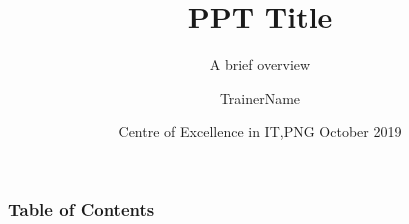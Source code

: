 \documentclass[hyperref={bookmarks=false},aspectratio=169]{beamer}
\title[PPT Title]
{\bfseries{PPT Title}}
\subtitle{A brief overview}
\author[TrainerName] %
{TrainerName\inst{1} } %
\institute[CEIT]
{
  \inst{1}
  Trainer\\
  Centre of Excellence in IT,PNG
}
\date[CEIT, 2014]
{Centre of Excellence in IT,PNG October 2019}
\begin{document}
\frame{\titlepage}  %

\begin{frame}
\frametitle{Table of Contents}
\tableofcontents
\end{frame}







\end{document}
